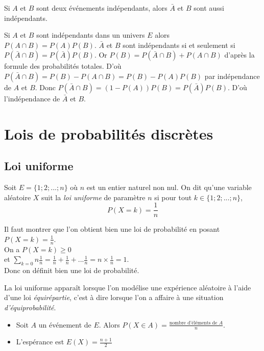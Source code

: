 \documentclass[french]{book}
\begin{document}
\begin{prop}
Si $A$ et $B$ sont deux événements indépendants, alors $\bar{A}$ et $B$ sont aussi indépendants.
\end{prop}

\begin{demo}[Preuve]
Si $A$ et $B$ sont indépendants dans un univers $E$ alors $P(A\cap B)=P(A)P(B)$. $\bar{A}$ et $B$ sont indépendants si et seulement si $P(\bar{A}\cap B)=P(\bar{A})P(B)$. Or $P(B)=P(\bar{A}\cap B)+P(A\cap B)$ d'après la formule des probabilités totales. D'où $P(\bar{A}\cap B)=P(B)-P(A\cap B)=P(B)-P(A)P(B)$ par indépendance de $A$ et $B$. Donc $P(\bar{A}\cap B)=(1-P(A))P(B)=P(\bar{A})P(B)$. D'où l'indépendance de $\bar{A}$ et $B$.
\end{demo}


\chapter{Lois de probabilités discrètes}

\section{Loi uniforme}

\begin{defn}
Soit $E=\{1;2;...;n\}$ où $n$ est un entier naturel non nul. On dit qu'une variable aléatoire $X$ suit la \emph{loi uniforme} de paramètre $n$ si pour tout $k\in \{1;2;...;n\}$, 
$$P(X=k)=\frac{1}{n}$$
\end{defn}

\begin{demo}
Il faut montrer que l'on obtient bien une loi de probabilité en posant $P(X=k)=\frac{1}{n}$.\\
On a  $P(X=k)\geq 0$\\
et $\sum_{k=0}{n}\frac{1}{n}=\frac{1}{n}+\frac{1}{n}+...\frac{1}{n}=n\times \frac{1}{n}=1$.\\
Donc on définit bien une loi de probabilité. 
\end{demo}

\begin{rem}
La loi uniforme apparaît lorsque l'on modélise une expérience aléatoire à l'aide d'une loi \emph{équirépartie}, c'est à dire lorsque l'on a affaire à une situation \emph{d'équiprobabilité}.
\end{rem}



\begin{prop}
\begin{itemize}
\item[$\bullet$] Soit $A$ un événement de $E$. Alors $P(X\in A)=\frac{\textrm{nombre d'éléments de }A}{n}$.
\item[$\bullet$] L'espérance est $E(X) = \frac{n+1}{2}$
\end{itemize}

\end{prop}
\end{document}
